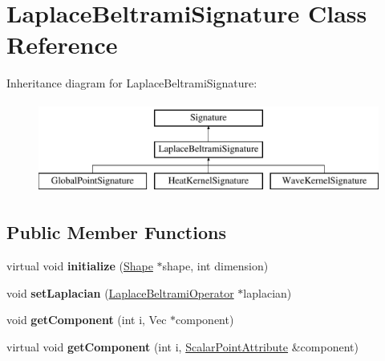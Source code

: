 \hypertarget{class_laplace_beltrami_signature}{}\section{Laplace\+Beltrami\+Signature Class Reference}
\label{class_laplace_beltrami_signature}
Inheritance diagram for Laplace\+Beltrami\+Signature\+:\begin{figure}[H]
\begin{center}
\leavevmode
\includegraphics[height=3.000000cm]{class_laplace_beltrami_signature}
\end{center}
\end{figure}
\subsection*{Public Member Functions}
\begin{DoxyCompactItemize}
\item 
\hypertarget{class_laplace_beltrami_signature_ac0bf63ba94eba7581a9f45188f23b265}{}virtual void {\bfseries initialize} (\hyperlink{class_shape}{Shape} $\ast$shape, int dimension)\label{class_laplace_beltrami_signature_ac0bf63ba94eba7581a9f45188f23b265}

\item 
\hypertarget{class_laplace_beltrami_signature_a8155758d176dd0c137016302df1f6d7b}{}void {\bfseries set\+Laplacian} (\hyperlink{class_laplace_beltrami_operator}{Laplace\+Beltrami\+Operator} $\ast$laplacian)\label{class_laplace_beltrami_signature_a8155758d176dd0c137016302df1f6d7b}

\item 
\hypertarget{class_laplace_beltrami_signature_a6904095097912d71d9529d7b28aedd5f}{}void {\bfseries get\+Component} (int i, Vec $\ast$component)\label{class_laplace_beltrami_signature_a6904095097912d71d9529d7b28aedd5f}

\item 
\hypertarget{class_laplace_beltrami_signature_a1ec84385eba59549630b9c9742c6a04f}{}virtual void {\bfseries get\+Component} (int i, \hyperlink{class_scalar_point_attribute}{Scalar\+Point\+Attribute} \&component)\label{class_laplace_beltrami_signature_a1ec84385eba59549630b9c9742c6a04f}

\end{DoxyCompactItemize}
